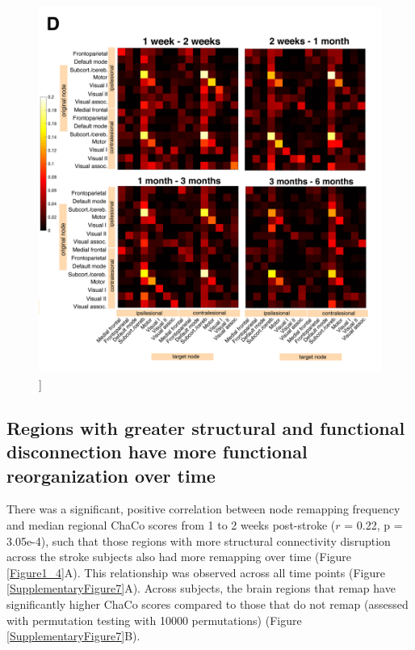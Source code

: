 \documentclass[phd,tocprelim]{cornell}
\renewcommand{\caption}[1]{\singlespacing\hangcaption{#1}\normalspacing}
\begin{document}
\null
\vfill
\clearpage
\null
\vfill
\begin{figure}[h!]
		\ContinuedFloat
		\captionsetup{labelformat=adja-page}
    \centering
    \includegraphics[width=\textwidth]{chapter1/Figure3D.png}
    \caption[]{}
\end{figure}
\null
\vfill
\clearpage

	\subsection{Regions with greater structural and functional disconnection  have more functional reorganization over time}
	There was a significant, positive correlation between node remapping frequency and median regional ChaCo scores from 1 to 2 weeks post-stroke ($r$ = 0.22, p = 3.05e-4), such that those regions with more structural connectivity disruption across the stroke subjects also had more remapping over time (Figure \ref{Figure1_4}A). This relationship was observed across all time points (Figure \ref{SupplementaryFigure7}A). Across subjects, the brain regions that remap have significantly higher ChaCo scores compared to those that do not remap (assessed with permutation testing with 10000 permutations) (Figure \ref{SupplementaryFigure7}B).
	
\end{document}
